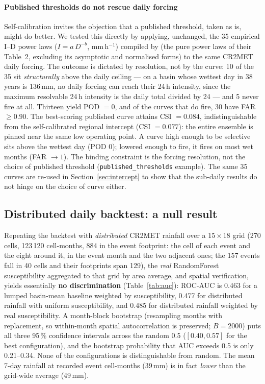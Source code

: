 \documentclass[authoryear,preprint,review,12pt]{elsarticle}
\begin{document}
\paragraph{Published thresholds do not rescue daily forcing}
Self-calibration invites the objection that a published threshold, taken as is,
might do better. We tested this directly by applying, unchanged, the 35 empirical
I--D power laws ($I=a\,D^{-b}$, mm\,h$^{-1}$) compiled by \citet{guzzetti2007}
(the pure power laws of their Table~2, excluding its asymptotic and normalised
forms) to the same CR2MET
daily forcing. The outcome is dictated by resolution, not by the curve: 10 of the
35 sit \emph{structurally} above the daily ceiling --- on a basin whose wettest
day in 38 years is 136\,mm, no daily forcing can reach their 24\,h intensity, since
the maximum resolvable 24\,h intensity is the daily total divided by 24 --- and 5
never fire at all. Thirteen yield POD $=0$, and of the curves that do fire, 30 have
FAR $\geq 0.90$. The best-scoring published curve attains CSI $=0.084$,
indistinguishable from the self-calibrated regional intercept (CSI $=0.077$): the
entire ensemble is pinned near the same low operating point. A curve high enough to
be selective sits above the wettest day (POD $0$); lowered enough to fire, it fires
on most wet months (FAR $\to 1$). The binding constraint is the forcing resolution,
not the choice of published threshold (\texttt{published\_thresholds} example). The
same 35 curves are re-used in Section~\ref{sec:intercept} to show that the sub-daily
results do not hinge on the choice of curve either.

\subsection{Distributed daily backtest: a null result}

Repeating the backtest with \emph{distributed} CR2MET rainfall over a
$15\times18$ grid (270 cells, 123\,120 cell-months, 884 in the event footprint: the
cell of each event and the eight around it, in the event month and the two adjacent
ones; the 157 events fall in 40 cells and their footprints span 129),
the \emph{real} RandomForest susceptibility aggregated to that grid by area average, and spatial
verification, yields essentially \textbf{no discrimination}
(Table~\ref{tab:auc}): ROC-AUC is 0.463 for a lumped basin-mean baseline
weighted by susceptibility, 0.477 for distributed rainfall with uniform
susceptibility, and 0.485 for distributed rainfall weighted by real
susceptibility. A month-block bootstrap (resampling months with replacement, so
within-month spatial autocorrelation is preserved; $B=2000$) puts all three 95\,\%
confidence intervals across the random 0.5 ($[0.40, 0.57]$ for the best
configuration), and the bootstrap probability that AUC exceeds 0.5 is only
0.21--0.34. None of the configurations is distinguishable from random. The mean
7-day rainfall at recorded event cell-months (39\,mm) is in fact \emph{lower}
than the grid-wide average (49\,mm).
\end{document}
